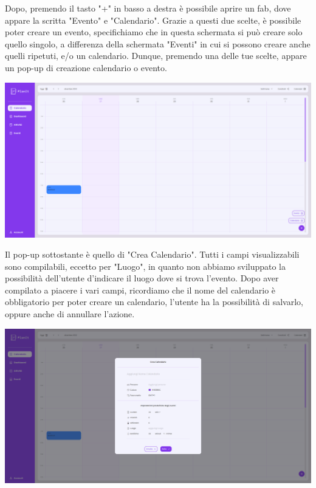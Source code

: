 Dopo, premendo il tasto "+" in basso a destra è possibile aprire un fab, dove appare la scritta "Evento" e "Calendario". Grazie a questi due scelte, è possibile poter creare un evento, specifichiamo che in questa schermata si può creare solo quello singolo, a differenza della schermata "Eventi" in cui si possono creare anche quelli ripetuti, e/o un calendario. Dunque, premendo una delle tue scelte, appare un pop-up di creazione calendario o evento.

\begin{center}
    \includegraphics[width=1\textwidth, height=0.3\textheight]{img/png/FrontEnd/Calendario/calendario_creazione.png}
\end{center}

Il pop-up sottostante è quello di "Crea Calendario". Tutti i campi visualizzabili sono compilabili, eccetto per "Luogo", in quanto non abbiamo sviluppato la possibilità dell'utente d'indicare il luogo dove si trova l'evento. Dopo aver compilato a piacere i vari campi, ricordiamo che il nome del calendario è obbligatorio per poter creare un calendario, l'utente ha la possibilità di salvarlo, oppure anche di annullare l'azione.

\begin{center}
    \includegraphics[width=1\textwidth, height=0.3\textheight]{img/png/FrontEnd/Calendario/calendario_creaCalendario.png}
\end{center}

